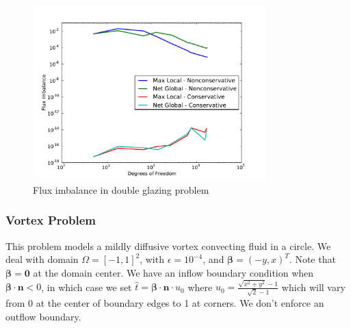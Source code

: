 \documentclass[letterpaper]{article}
\def\bbeta{\boldsymbol\beta}
\begin{document}
\begin{figure}[p]
\centering
\includegraphics[width=0.8\textwidth]{figs/DoubleGlazing/modifiedFlux.pdf}
\caption{Flux imbalance in double glazing problem}
\label{fig:doubleglazingFlux}
\end{figure}

\subsubsection{Vortex Problem}
This problem models a mildly diffusive vortex convecting fluid in a circle. We
deal with domain $\Omega=[-1,1]^2$, with $\epsilon=10^{-4}$, and
$\bbeta=(-y,x)^T$. Note that $\bbeta=\mathbf{0}$ at the domain center. We have an
inflow boundary condition when $\bbeta\cdot\mathbf{n}<0$, in which case we set
$\hat t=\bbeta\cdot\mathbf{n}\cdot u_0$ where
$u_0=\frac{\sqrt{x^2+y^2}-1}{\sqrt{2}-1}$ which will vary from 0 at the center
of boundary edges to 1 at corners. We don't enforce an outflow boundary.
\end{document}
